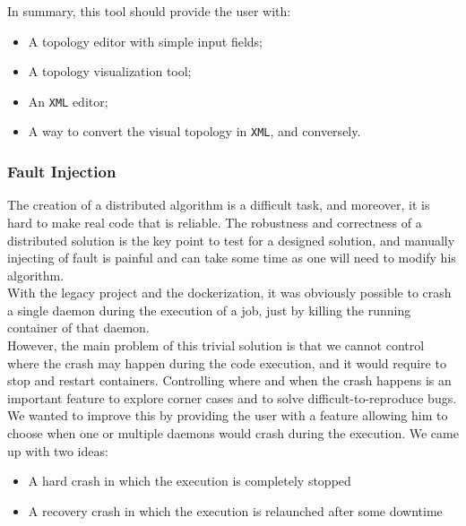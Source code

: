 \documentclass{eplmastersthesis}
\begin{document}
          In summary, this tool should provide the user with:

          \begin{itemize}
            \item A topology editor with simple input fields;
            \item A topology visualization tool;
            \item An \texttt{XML} editor;
            \item A way to convert the visual topology in \texttt{XML}, and conversely.
          \end{itemize}

        \subsubsection{Fault Injection}

          The creation of a distributed algorithm is a difficult task, and
          moreover, it is hard to make real code that is reliable. The robustness
          and correctness of a distributed solution is the key point to test
          for a designed solution, and manually injecting of fault is painful
          and can take some time as one will need to modify his algorithm.\\

          With the legacy project and the dockerization, it was obviously
          possible to crash a single daemon during the execution of a job, just
          by killing the running container of that daemon.\\
          However, the main problem of this trivial solution is that we cannot
          control where the crash may happen during the code execution, and
          it would require to stop and restart containers. Controlling where
          and when the crash happens is an important feature to explore
          corner cases and to solve difficult-to-reproduce bugs.\\
          We wanted to improve this by providing the user with a feature
          allowing him to choose when one or multiple daemons would crash during
          the execution. We came up with two ideas:

          \begin{itemize}
            \item A hard crash in which the execution is completely stopped
            \item A recovery crash in which the execution is relaunched after some
            downtime
          \end{itemize}
\end{document}
